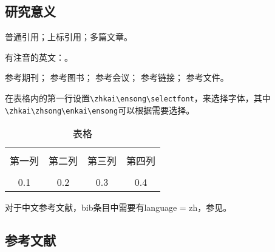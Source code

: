 
\subsection{研究意义}
\vspace{-5pt}

普通引用\cite{test}；上标引用；多篇文章。

有注音的英文：\cite{test}。

参考期刊\cite{test}；
参考图书\cite{test2}；
参考会议\cite{test5}；
参考链接\cite{test4}；
参考文件\cite{test6}。

在表格内的第一行设置\verb|\zhkai\ensong\selectfont|，来选择字体，其中\verb|\zhkai\zhsong\enkai\ensong|可以根据需要选择。
\begin{table}[htbp]
	\zhkai\ensong\selectfont%
	\centering  %
	\caption{表格}  %
	\label{table1}  %
	\begin{tabular}{|c|c|c|c|}  
		\hline  %
		& & & \\[-6pt]  %
		第一列&第二列&第三列&第四列 \\  %
		\hline
		& & & \\[-6pt]  %
		0.1&0.2&0.3&0.4 \\
		\hline
	\end{tabular}
\end{table}

对于中文参考文献，bib条目中需要有language = {zh}，参见\cite{test2}。

\begin{REF}
\subsection*{参考文献}
\vspace{-50pt}

\end{REF}


